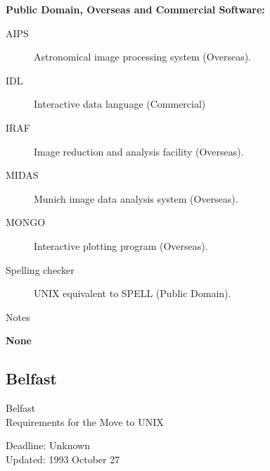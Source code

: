 \vspace{5mm}
\begin{center}
{\bf Public Domain, Overseas and Commercial Software:}
\end{center}

\begin{description}
\item[AIPS] Astronomical image processing system (Overseas).
\item[IDL] Interactive data language (Commercial)
\item[IRAF] Image reduction and analysis facility (Overseas).
\item[MIDAS] Munich image data analysis system (Overseas).
\item[MONGO] Interactive plotting program (Overseas).
\item[Spelling checker] UNIX equivalent to SPELL (Public Domain).
\end{description}


\vspace{5mm}
\begin{center}
{\large\sc Notes}
\end{center}

{\bf None}


\newpage
\subsection{Belfast}

\renewcommand{\starsitename}{Belfast}
\renewcommand{\starnodename}{QUVAD}

\renewcommand{\starunixdate}{Unknown}
\renewcommand{\starupdate}{1993 October 27}

\renewcommand{\starsitetelephone}{0232 245133 Ext. 3648}
\renewcommand{\starsitefax}{0232 438918}

\begin{center}
{\Large\sc \starsitename \\ [2ex]
           Requirements for the Move to UNIX}

\vspace{3mm}
{\large\sc Deadline: \starunixdate \\ [1ex]
           Updated: \starupdate}
\end{center}

\vspace{5mm}


